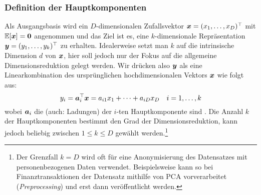 \subsubsection{Definition der Hauptkomponenten}
\label{ch:MethodenDerDimRed:statistisch:PCA:Definition}
Als Ausgangsbasis wird ein $D$-dimensionalen Zufallsvektor $\bm{x} = (x_1, \ldots, x_D)^\top$ mit $\operatorname{\mathbb{E}}[\bm{x}] = \bm{0}$ angenommen und das Ziel ist es, eine $k$-dimensionale Repräsentation $\bm{y} = (y_1,\ldots,y_k)^\top$ zu erhalten. Idealerweise setzt man $k$ auf die intrinsische Dimension $d$ von $\bm{x}$, hier soll jedoch nur der Fokus auf die allgemeine Dimensionsreduktion gelegt werden. Wir drücken also $\bm{y}$ als eine Linearkombination des ursprünglichen hochdimensionalen Vektors $\bm{x}$ wie folgt aus:
\begin{equation}
	y_i = \bm{a}_i^\top \bm{x} = a_{i1} x_1 + \cdots + a_{iD} x_D
	\quad i = 1,\ldots,k
\end{equation}
wobei $\bm{a}_i$ die  (auch: Ladungen) der $i$-ten Hauptkomponente sind \parencite[vgl.][2]{Jolliffe.2002}. Die Anzahl $k$ der Hauptkomponenten bestimmt den Grad der
Dimensionsreduktion, kann jedoch beliebig zwischen $1 \leq k \leq D$ gewählt werden.\footnote{Der
	Grenzfall $k = D$ wird oft für eine Anonymisierung des Datensatzes mit personenbezogenen Daten
	verwendet. Beispielsweise kann so bei Finanztransaktionen der Datensatz mithilfe von PCA
	vorverarbeitet (\textit{Preprocessing}) und erst dann veröffentlicht werden.}

